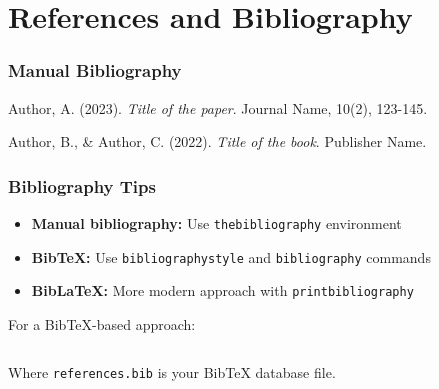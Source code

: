 \documentclass[aspectratio=169,professionalfonts]{beamer}
\begin{document}
\section{References and Bibliography}

\begin{frame}
    \frametitle{Manual Bibliography}
    
    \begin{thebibliography}{9}
        Author, A. (2023). 
        \textit{Title of the paper}. 
        Journal Name, 10(2), 123-145.
        
        Author, B., \& Author, C. (2022). 
        \textit{Title of the book}.
        Publisher Name.
    \end{thebibliography}
\end{frame}

\begin{frame}
    \frametitle{Bibliography Tips}
    
    \begin{tcolorbox}[colback=ugmLightGrey,colframe=ugmBlue,title=Bibliography Options]
        \begin{itemize}
            \item \textbf{Manual bibliography:} Use \texttt{thebibliography} environment
            \item \textbf{BibTeX:} Use \texttt{bibliographystyle} and \texttt{bibliography} commands
            \item \textbf{BibLaTeX:} More modern approach with \texttt{printbibliography}
        \end{itemize}
    \end{tcolorbox}
    
    \begin{tcolorbox}[colback=yellow!10,colframe=yellow!50!black,title=\faLightbulb\ Tip]
        For a BibTeX-based approach:
        
        \begin{lstlisting}[language=TeX, basicstyle=\ttfamily\footnotesize]


        \end{lstlisting}
        
        Where \texttt{references.bib} is your BibTeX database file.
    \end{tcolorbox}
\end{frame}

\end{document}
